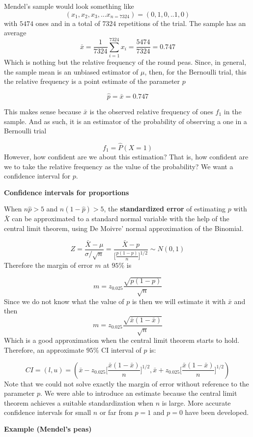 \documentclass[
]{book}
\begin{document}
Mendel's sample would look something like
\[(x_1,x_2, x_3, ...x_{n=7324})=(0,1,0,.. 1, 0)\] with \(5474\) ones and in a total of \(7324\) repetitions of the trial. The sample has an average \[\bar{x}=\frac{1}{7324}\sum_{i=1}^{7324} x_i=\frac{5474}{7324}=0.747\]
Which is nothing but the relative frequency of the round peas. Since, in general, the sample mean is an unbiased estimator of \(\mu\), then, for the Bernoulli trial, this the relative frequency is a point estimate of the parameter \(p\)

\[\hat{p}=\bar{x}=0.747\]

This makes sense because \(\bar{x}\) is the observed relative frequency of ones \(f_1\) in the sample. And as such, it is an estimator of the probability of observing a one in a Bernoulli trial

\[f_1 =\hat{P}(X=1)\]
However, how confident are we about this estimation? That is, how confident are we to take the relative frequency as the value of the probability? We want a confidence interval for \(p\).

\textbf{Confidence intervals for proportions}

When \(n\hat{p}>5\) and \(n(1-\hat{p})>5\), the \textbf{standardized error} of estimating \(p\) with \(\bar{X}\) can be approximated to a standard normal variable with the help of the central limit theorem, using De Moivre' normal approximation of the Binomial.

\[Z=\frac{\bar{X}-\mu}{\sigma/\sqrt{n}}= \frac{\bar{X}-p}{\big[\frac{p(1-p)}{n} \big]^{1/2}}\sim N(0,1)\]
Therefore the margin of error \(m\) at \(95\%\) is

\[m=  z_{0.025}\frac{\sqrt{p(1-p)}}{\sqrt{n}}\]
Since we do not know what the value of \(p\) is then we will estimate it with \(\bar{x}\) and then
\[m=  z_{0.025}\frac{\sqrt{\bar{x}(1-\bar{x})}}{\sqrt{n}}\]
Which is a good approximation when the central limit theorem starts to hold. Therefore, an approximate \(95\%\) CI interval of \(p\) is:

\[CI=(l,u)=(\bar{x}-z_{0.025}\big[\frac{\bar{x}(1-\bar{x})}{n} \big]^{1/2},  \bar{x}+z_{0.025}\big[\frac{\bar{x}(1-\bar{x})}{n} \big]^{1/2})\]
Note that we could not solve exactly the margin of error without reference to the parameter \(p\). We were able to introduce an estimate because the central limit theorem achieves a suitable standardization when \(n\) is large. More accurate confidence intervals for small \(n\) or far from \(p=1\) and \(p=0\) have been developed.

\textbf{Example (Mendel's peas)}
\end{document}
